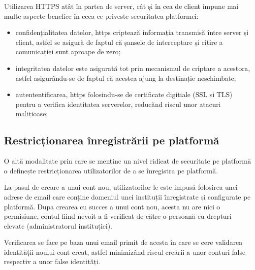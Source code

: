 Utilizarea HTTPS atât în partea de server, cât și în cea de client impune mai multe aspecte benefice în ceea ce priveste securitatea platformei:

\begin{itemize}
	
	\item confidențialitatea datelor, https criptează informația transmisă între server și client, astfel se asigură de faptul că șansele de interceptare și citire a  comunicației sunt aproape de zero;
	
	\item integritatea datelor este asigurată tot prin mecanismul de criptare a acestora, astfel asigurându-se de faptul că acestea ajung la destinație neschimbate;
	
	\item autententificarea, https folosindu-se de certificate digitiale (SSL și TLS) pentru a verifica identitatea serverelor, reducănd riscul unor atacuri malițioase; 
	
\end{itemize}


\subsection*{Restricționarea înregistrării pe platformă}

O altă modalitate prin care se menține un nivel ridicat de securitate pe platformă o definește restricționarea utilizatorilor de a se înregistra pe platformă.

La pasul de creare a unui cont nou, utilizatorilor le este  impusă folosirea unei adrese de email care conține domeniul unei instituții înregistrate și configurate pe platformă. Dupa crearea cu succes a unui cont nou, acesta nu are nici o permisiune, contul fiind nevoit a fi verificat de către o persoană cu drepturi elevate (administratorul instituției).

Verificarea se face pe baza unui email primit de acesta în care se cere validarea identității noului cont creat, astfel minimizând riscul creării a unor conturi false respectiv a unor false identități.

\newpage
